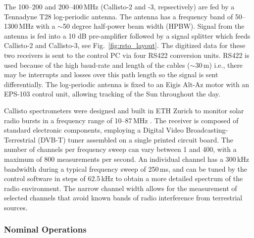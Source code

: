 The 100--200 and 200--400\,MHz (Callisto-2 and -3, repsectively) are fed by a Tennadyne T28 log-periodic antenna. The antenna has a frequency band of 50--1300\,MHz with a $\sim$50 degree half-power beam width (HPBW). Signal from the antenna is fed into a 10 dB pre-amplifier followed by a signal splitter which feeds Callisto-2 and Callisto-3, see Fig.~\ref{fig:rsto_layout}. The digitized data for these two receivers is sent to the control PC via four RS422 conversion units. RS422 is used because of the high baud-rate and length of the cables ($\sim30$\,m) i.e., there may be interrupts and losses over this path length so the signal is sent differentially. The log-periodic antenna is fixed to an Eigis Alt-Az motor with an EPS-103 control unit, allowing tracking of the Sun throughout the day. 

Callisto spectrometers were designed and built in ETH Zurich to monitor solar radio bursts in a frequency range of 10--87\,MHz \citep{Benz2005}. The receiver is composed of standard electronic components, employing a Digital Video Broadcasting-Terrestrial (DVB-T) tuner assembled on a single printed circuit board. The number of channels per frequency sweep can vary between 1 and 400, with a maximum of 800 measurements per second. An individual channel has a 300\,kHz bandwidth during a typical frequency sweep of 250\,ms, and can be tuned by the control software in steps of 62.5\,kHz to obtain a more detailed spectrum of the radio environment. The narrow channel width allows for the measurement of selected channels that avoid known bands of radio interference from terrestrial sources.

\subsubsection{Nominal Operations}

